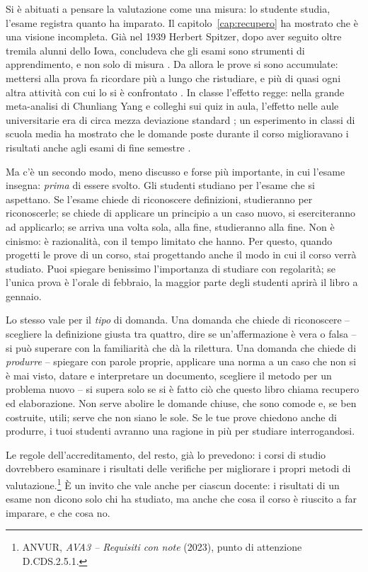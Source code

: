 Si è abituati a pensare la valutazione come una misura: lo studente
studia, l'esame registra quanto ha imparato. Il capitolo~\ref{cap:recupero}
ha mostrato che è una visione incompleta. Già nel 1939 Herbert Spitzer,
dopo aver seguito oltre tremila alunni dello Iowa, concludeva che gli
esami sono strumenti di apprendimento, e non solo di misura
\parencite{spitzer1939}. Da allora le prove si sono accumulate:
mettersi alla prova fa ricordare più a lungo che ristudiare, e più di
quasi ogni altra attività con cui lo si è confrontato
\parencite{adesope2017}. In classe l'effetto regge: nella grande
meta-analisi di Chunliang Yang e colleghi sui quiz in aula, l'effetto
nelle aule universitarie era di circa mezza deviazione standard
\parencite{yang2021}; un esperimento in classi di scuola media ha
mostrato che le domande poste durante il corso miglioravano i
risultati anche agli esami di fine semestre \parencite{roediger2011}.

Ma c'è un secondo modo, meno discusso e forse più importante, in cui
l'esame insegna: \emph{prima} di essere svolto. Gli studenti studiano
per l'esame che si aspettano. Se l'esame chiede di riconoscere
definizioni, studieranno per riconoscerle; se chiede di applicare un
principio a un caso nuovo, si eserciteranno ad applicarlo; se arriva
una volta sola, alla fine, studieranno alla fine. Non è cinismo: è
razionalità, con il tempo limitato che hanno. Per questo, quando
progetti le prove di un corso, stai progettando anche il modo in cui
il corso verrà studiato. Puoi spiegare benissimo l'importanza di
studiare con regolarità; se l'unica prova è l'orale di febbraio, la
maggior parte degli studenti aprirà il libro a gennaio.

Lo stesso vale per il \emph{tipo} di domanda. Una domanda che chiede di
riconoscere -- scegliere la definizione giusta tra quattro, dire se
un'affermazione è vera o falsa -- si può superare con la familiarità
che dà la rilettura. Una domanda che chiede di \emph{produrre} --
spiegare con parole proprie, applicare una norma a un caso che non si
è mai visto, datare e interpretare un documento, scegliere il metodo
per un problema nuovo -- si supera solo se si è fatto ciò che questo
libro chiama recupero ed elaborazione. Non serve abolire le domande
chiuse, che sono comode e, se ben costruite, utili; serve che non
siano le sole. Se le tue prove chiedono anche di produrre, i tuoi
studenti avranno una ragione in più per studiare interrogandosi.

Le regole dell'accreditamento, del resto, già lo prevedono: i corsi di
studio dovrebbero esaminare i risultati delle verifiche per migliorare
i propri metodi di valutazione.\footnote{ANVUR, \emph{AVA3 --
Requisiti con note} (2023), punto di attenzione D.CDS.2.5.1.} È un
invito che vale anche per ciascun docente: i risultati di un esame
non dicono solo chi ha studiato, ma anche che cosa il corso è
riuscito a far imparare, e che cosa no.

